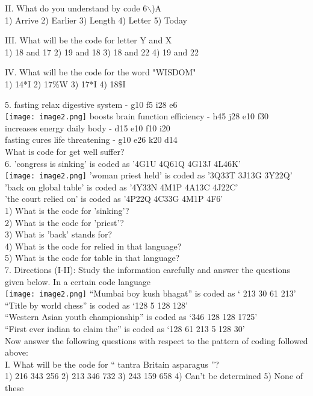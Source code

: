 \documentclass[
]{article}
\begin{document}
II. What do you understand by code 6$\backslash$)A\\
1) Arrive 2) Earlier 3) Length 4) Letter 5) Today

III. What will be the code for letter Y and X\\
1) 18 and 17 2) 19 and 18 3) 18 and 22 4) 19 and 22

IV. What will be the code for the word "WISDOM"\\
1) 14*I 2) 17\%W 3) 17*I 4) 18\$I

5. fasting relax digestive system - g10 f5 i28 e6\\
\texttt{[image: image2.png]}
boosts brain function efficiency - h45 j28 e10 f30\\
increases energy daily body - d15 e10 f10 i20\\
fasting cures life threatening - g10 e26 k20 d14\\
What is code for get well suffer?\\

6. 'congress is sinking' is coded as '4G1U 4Q61Q 4G13J 4L46K'\\
\texttt{[image: image2.png]}
'woman priest held' is coded as '3Q33T 3J13G 3Y22Q'\\
'back on global table' is coded as '4Y33N 4M1P 4A13C 4J22C'\\
'the court relied on' is coded as '4P22Q 4C33G 4M1P 4F6'\\
1) What is the code for 'sinking'?\\
2) What is the code for 'priest'?\\
3) What is 'back' stands for?\\
4) What is the code for relied in that language?\\
5) What is the code for table in that language?\\

7. Directions (I-II): Study the information carefully and answer the questions given below. In a certain code language\\
\texttt{[image: image2.png]}
“Mumbai boy kush bhagat” is coded as ‘ 213 30 61 213’\\
“Title by world chess” is coded as ‘128 5 128 128’\\
“Western Asian youth championship” is coded as ‘346 128 128 1725’\\
“First ever indian to claim the” is coded as ‘128 61 213 5 128 30’\\
Now answer the following questions with respect to the pattern of coding followed above:\\
I. What will be the code for “ tantra Britain asparagus ”?\\
1) 216 343 256 2) 213 346 732 3) 243 159 658
4) Can’t be determined 5) None of these
\end{document}
